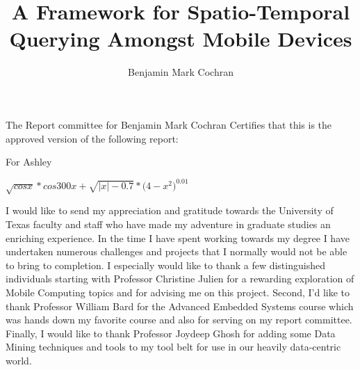 \documentclass[12pt]{report}	%
\author{Benjamin Mark Cochran}  	%
\title{A Framework for Spatio-Temporal Querying Amongst Mobile
Devices}
\theoremstyle{definition}
\theoremstyle{remark}
\begin{document}
\copyrightpage          %


%
%
%

\begin{center}
The Report committee for Benjamin Mark Cochran \linebreak
Certifies that this is the approved version of the following report:
\end{center}

\commcertpage           %
						
\titlepage              %

%
\begin{dedication}
%
For Ashley

$\sqrt{cosx}*cos300x+\sqrt{\left|{x}\right|-0.7}*(4-{x}^{2}{)}^{0.01}$
\end{dedication}


\begin{acknowledgments}		%
%
I would like to send my appreciation and gratitude towards the
University of Texas faculty and staff who have made my adventure in
graduate studies an enriching experience. In the time I have spent
working towards my degree I have undertaken numerous challenges and
projects that I normally would not be able to bring to completion. I
especially would like to thank a few distinguished individuals starting
with Professor Christine Julien for a rewarding exploration of Mobile
Computing topics and for advising me on this project. Second, I'd like
to thank Professor William Bard for the Advanced Embedded Systems course
which was hands down my favorite course and also for serving on my
report committee. Finally, I would like to thank Professor Joydeep Ghosh
for adding some Data Mining techniques and tools to my tool belt for use
in our heavily data-centric world.
\end{acknowledgments}
\end{document}
